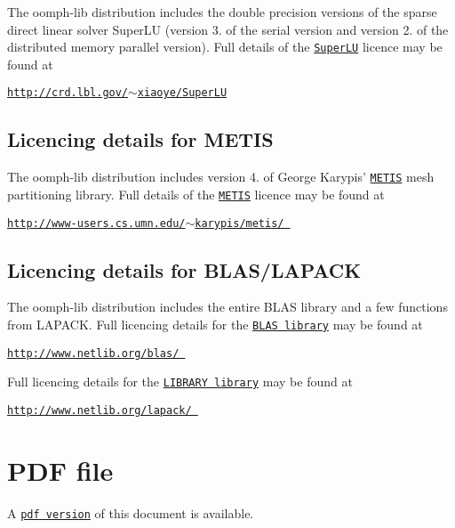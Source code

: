 The {\ttfamily oomph-\/lib} distribution includes the double precision versions of the sparse direct linear solver Super\-L\-U (version 3. of the serial version and version 2. of the distributed memory parallel version). Full details of the \href{http://crd.lbl.gov/~xiaoye/SuperLU}{\tt Super\-L\-U} licence may be found at \begin{center} \href{http://crd.lbl.gov/~xiaoye/SuperLU}{\tt http\-://crd.\-lbl.\-gov/$\sim$xiaoye/\-Super\-L\-U} \end{center} 





\subsection*{Licencing details for M\-E\-T\-I\-S}

The {\ttfamily oomph-\/lib} distribution includes version 4. of George Karypis' \href{http://www-users.cs.umn.edu/~karypis/metis/}{\tt M\-E\-T\-I\-S} mesh partitioning library. Full details of the \href{http://www-users.cs.umn.edu/~karypis/metis/}{\tt M\-E\-T\-I\-S} licence may be found at \begin{center} \href{http://www-users.cs.umn.edu/~karypis/metis/}{\tt http\-://www-\/users.\-cs.\-umn.\-edu/$\sim$karypis/metis/ } \end{center} 





\subsection*{Licencing details for B\-L\-A\-S/\-L\-A\-P\-A\-C\-K}

The {\ttfamily oomph-\/lib} distribution includes the entire B\-L\-A\-S library and a few functions from L\-A\-P\-A\-C\-K. Full licencing details for the \href{http://www.netlib.org/blas/}{\tt B\-L\-A\-S library} may be found at \begin{center} \href{http://www.netlib.org/blas/}{\tt http\-://www.\-netlib.\-org/blas/ } \end{center}  Full licencing details for the \href{http://www.netlib.org/lapack/}{\tt L\-I\-B\-R\-A\-R\-Y library} may be found at \begin{center} \href{http://www.netlib.org/lapack/}{\tt http\-://www.\-netlib.\-org/lapack/ } \end{center}  





 

 \hypertarget{index_pdf}{}\section{P\-D\-F file}\label{index_pdf}
A \href{../latex/refman.pdf}{\tt pdf version} of this document is available. 